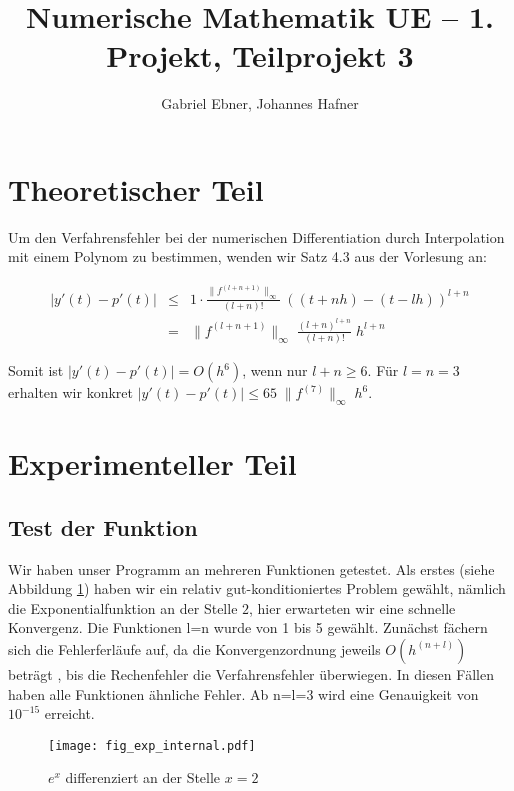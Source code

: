 \documentclass{scrartcl}
\begin{document}
\title{Numerische Mathematik UE -- 1. Projekt, Teilprojekt 3}
\author{Gabriel Ebner, Johannes Hafner}
\maketitle

\section{Theoretischer Teil}

Um den Verfahrensfehler bei der numerischen Differentiation durch Interpolation
mit einem Polynom zu bestimmen, wenden wir Satz 4.3 aus der Vorlesung an:

\begin{eqnarray*}
|y'(t) - p'(t)| &\leq& 1 \cdot
    \frac{\|f^{(l+n+1)}\|_\infty}{(l+n)!}\; ((t+nh) - (t-lh))^{l+n} \\
  &=& \|f^{(l+n+1)}\|_\infty\; \frac{(l+n)^{l+n}}{(l+n)!}\; h^{l+n}
\end{eqnarray*}

Somit ist \(|y'(t)-p'(t)| = O(h^6)\), wenn nur \(l+n \geq 6\).  Für \(l=n=3\)
erhalten wir konkret \(|y'(t)-p'(t)| \leq 65\; \|f^{(7)}\|_\infty\; h^6\).

\section{Experimenteller Teil}
\subsection{Test der Funktion}

Wir haben unser Programm an mehreren Funktionen getestet.  Als erstes (siehe
Abbildung \ref{fig:exp}) haben wir ein relativ gut-konditioniertes Problem
gewählt, nämlich die Exponentialfunktion an der Stelle \(2\), hier erwarteten
wir eine schnelle Konvergenz.
Die Funktionen l=n wurde von 1 bis 5 gewählt.
Zunächst fächern sich die Fehlerferläufe auf, da die Konvergenzordnung jeweils \(O(h^{(n+l)})\) beträgt , bis die Rechenfehler die Verfahrensfehler überwiegen. In diesen Fällen haben alle Funktionen ähnliche Fehler.
Ab n=l=3 wird eine Genauigkeit von \(10^{-15}\) erreicht.

\begin{figure}[!htb]
\centering
\texttt{[image: fig\_exp\_internal.pdf]}
\caption{\(e^x\) differenziert an der Stelle \(x=2\)}
\label{fig:exp}
\end{figure}
\end{document}
